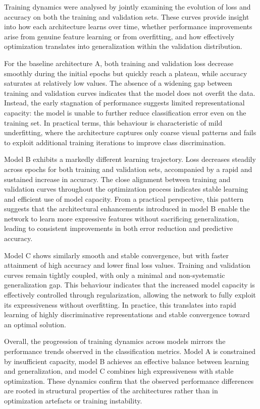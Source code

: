 \documentclass{article}
\begin{document}
Training dynamics were analysed by jointly examining the evolution of
loss and accuracy on both the training and validation sets. These curves
provide insight into how each architecture learns over time, whether
performance improvements arise from genuine feature learning or from
overfitting, and how effectively optimization translates into
generalization within the validation distribution.

For the baseline architecture A, both training and validation loss
decrease smoothly during the initial epochs but quickly reach a plateau,
while accuracy saturates at relatively low values. The absence of a
widening gap between training and validation curves indicates that the
model does not overfit the data. Instead, the early stagnation of
performance suggests limited representational capacity: the model is
unable to further reduce classification error even on the training set.
In practical terms, this behaviour is characteristic of mild
underfitting, where the architecture captures only coarse visual
patterns and fails to exploit additional training iterations to improve
class discrimination.

Model B exhibits a markedly different learning trajectory. Loss
decreases steadily across epochs for both training and validation sets,
accompanied by a rapid and sustained increase in accuracy. The close
alignment between training and validation curves throughout the
optimization process indicates stable learning and efficient use of
model capacity. From a practical perspective, this pattern suggests that
the architectural enhancements introduced in model B enable the network
to learn more expressive features without sacrificing generalization,
leading to consistent improvements in both error reduction and
predictive accuracy.

Model C shows similarly smooth and stable convergence, but with faster
attainment of high accuracy and lower final loss values. Training and
validation curves remain tightly coupled, with only a minimal and
non-systematic generalization gap. This behaviour indicates that the
increased model capacity is effectively controlled through
regularization, allowing the network to fully exploit its expressiveness
without overfitting. In practice, this translates into rapid learning of
highly discriminative representations and stable convergence toward an
optimal solution.

Overall, the progression of training dynamics across models mirrors the
performance trends observed in the classification metrics. Model A is
constrained by insufficient capacity, model B achieves an effective
balance between learning and generalization, and model C combines high
expressiveness with stable optimization. These dynamics confirm that the
observed performance differences are rooted in structural properties of
the architectures rather than in optimization artefacts or training
instability.
\end{document}

